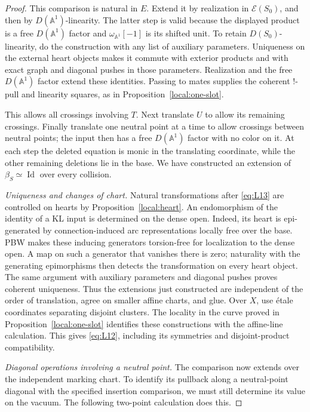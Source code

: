 \begin{proof}
This comparison is natural in $E$.  Extend it by realization in
$\mathcal E(S_0)$, and then by $D(\mathbb A^1)$-linearity.  The latter
step is valid because the displayed product is a free
$D(\mathbb A^1)$ factor and $\omega_{\mathbb A^1}[-1]$ is its shifted
unit.  To retain $D(S_0)$-linearity, do the construction with any
list of auxiliary parameters.  Uniqueness on the external heart
objects makes it commute with exterior products and with exact
graph and diagonal pushes in those parameters.  Realization and
the free $D(\mathbb A^1)$ factor extend these identities.  Passing
to mates supplies the coherent !-pull and linearity squares,
as in Proposition~\ref{local:one-slot}.

This allows all crossings involving $T$.  Next translate $U$ to
allow its remaining crossings.  Finally translate one neutral
point at a time to allow crossings between neutral points; the
input then has a free $D(\mathbb A^1)$ factor with no color on it.
At each step the deleted equation is monic in the translating
coordinate, while the other remaining deletions lie in the base.
We have constructed an extension of $\beta_S\simeq\operatorname{Id}$
over every collision.

\smallskip
\noindent\emph{Uniqueness and changes of chart.}
Natural transformations after \eqref{eq:L13} are controlled on
hearts by Proposition~\ref{local:heart}.  An endomorphism of the
identity of a KL input is determined on the dense open.  Indeed,
its heart is epi-generated by connection-induced arc
representations locally free over the base.  PBW makes these
inducing generators torsion-free for localization to the dense
open.  A map on such a generator that vanishes there is zero;
naturality with the generating epimorphisms then detects the
transformation on every heart object.  The same argument with
auxiliary parameters and diagonal pushes proves coherent
uniqueness.  Thus the extensions just constructed are independent
of the order of translation, agree on smaller affine charts, and
glue.  Over $X$, use étale coordinates separating disjoint
clusters.  The locality in the curve proved in
Proposition~\ref{local:one-slot} identifies these constructions
with the affine-line calculation.  This gives \eqref{eq:L12},
including its symmetries and disjoint-product compatibility.

\smallskip
\noindent\emph{Diagonal operations involving a neutral point.}
The comparison now extends over the independent marking chart.  To
identify its pullback along a neutral-point diagonal with the
specified insertion comparison, we must still determine its value
on the vacuum.  The following two-point calculation does this.


\end{proof}
